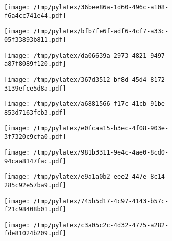 \documentclass{article}
\begin{document}
\begin{figure}[htbp]
\begin{subfigure}[b]{.3\linewidth}
\texttt{[image: /tmp/pylatex/36bee86a-1d60-496c-a108-f6a4cc741e44.pdf]}
\end{subfigure}
\begin{subfigure}[b]{.3\linewidth}
\texttt{[image: /tmp/pylatex/bfb7fe6f-adf6-4cf7-a33c-05f33893b811.pdf]}
\end{subfigure}
\begin{subfigure}[b]{.3\linewidth}
\texttt{[image: /tmp/pylatex/da06639a-2973-4821-9497-a87f8089f120.pdf]}
\end{subfigure}
\begin{subfigure}[b]{.3\linewidth}
\texttt{[image: /tmp/pylatex/367d3512-bf8d-45d4-8172-3139efce5d8a.pdf]}
\end{subfigure}
\begin{subfigure}[b]{.3\linewidth}
\texttt{[image: /tmp/pylatex/a6881566-f17c-41cb-91be-853d7163fcb3.pdf]}
\end{subfigure}
\begin{subfigure}[b]{.3\linewidth}
\texttt{[image: /tmp/pylatex/e0fcaa15-b3ec-4f08-903e-3f7320c9cfa0.pdf]}
\end{subfigure}
\begin{subfigure}[b]{.3\linewidth}
\texttt{[image: /tmp/pylatex/981b3311-9e4c-4ae0-8cd0-94caa8147fac.pdf]}
\end{subfigure}
\begin{subfigure}[b]{.3\linewidth}
\texttt{[image: /tmp/pylatex/e9a1a0b2-eee2-447e-8c14-285c92e57ba9.pdf]}
\end{subfigure}
\begin{subfigure}[b]{.3\linewidth}
\texttt{[image: /tmp/pylatex/745b5d17-4c97-4143-b57c-f21c98408b01.pdf]}
\end{subfigure}
\begin{subfigure}[b]{.3\linewidth}
\texttt{[image: /tmp/pylatex/c3a05c2c-4d32-4775-a282-fde81024b209.pdf]}
\end{subfigure}
\end{figure}
\end{document}
